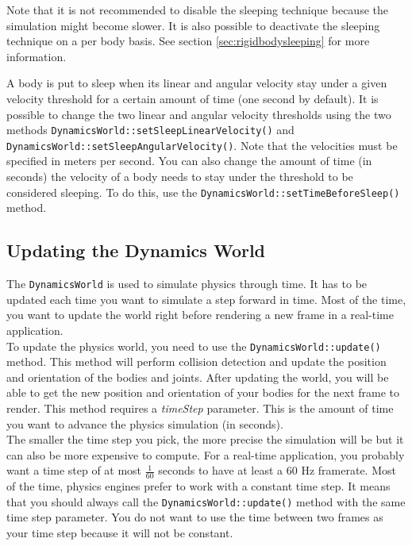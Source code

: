 \documentclass[a4paper,12pt]{article}
\begin{document}
    Note that it is not recommended to disable the sleeping technique because the simulation might become slower. It is also possible to deactivate the sleeping technique on a
    per body basis. See section \ref{sec:rigidbodysleeping} for more information. \\

    \begin{sloppypar}
      A body is put to sleep when its linear and angular velocity stay under a given velocity threshold for a certain amount of time (one second by default). It is possible to
      change the two
      linear and angular velocity thresholds using the two methods \texttt{DynamicsWorld::setSleepLinearVelocity()} and \texttt{DynamicsWorld::setSleepAngularVelocity()}.
      Note that the velocities must
      be specified in meters per second. You can also change the amount of time (in seconds) the velocity of a body needs to stay under the threshold to be considered
      sleeping. To do this, use the
    \texttt{DynamicsWorld::setTimeBeforeSleep()} method.
   \end{sloppypar}

    \subsection{Updating the Dynamics World}

    The \texttt{DynamicsWorld} is used to simulate physics through time. It has to be updated each time you want to simulate a step forward in time. Most of the time,
    you want to update the world right before rendering a new frame in a real-time application. \\

    To update the physics world, you need to use the \texttt{DynamicsWorld::update()} method. This method will perform collision detection and update the
    position and orientation of the bodies and joints. After updating the world, you will be able to get the new position and orientation of your bodies for the next
    frame to render. This method requires a \emph{timeStep} parameter. This is the amount of time you want to advance the physics simulation (in seconds). \\

    The smaller the time step you pick, the more precise the simulation will be but it can also be more expensive to compute. For a real-time application, you
    probably want a time step of at most $\frac{1}{60}$ seconds to
    have at least a 60 Hz framerate. Most of the time, physics engines prefer to work with a constant time step. It means that you should always call
    the \texttt{DynamicsWorld::update()} method with the same time step parameter. You do not want to use the time between two frames as your time step because it will
    not be constant. \\
\end{document}
